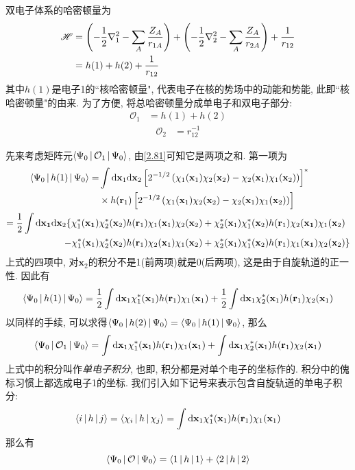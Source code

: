 双电子体系的哈密顿量为
\begin{align}
\mathscr{H}&=\left( -\frac{1}{2}\nabla_1^2 - \sum_A\frac{Z_A}{r_{1A}} \right) + \left( -\frac{1}{2}\nabla_2^2 - \sum_A\frac{Z_A}{r_{2A}} \right) + \frac{1}{r_{12}}\notag\\
&=h(1) + h(2) + \frac{1}{r_{12}}
\end{align}
其中$h(1)$是电子1的``核哈密顿量", 
代表电子在核的势场中的动能和势能, 
此即``核哈密顿量"的由来. 
为了方便, 
将总哈密顿量分成单电子和双电子部分:
\begin{align}
\mathcal{O}_1&=h(1)+h(2)
\label{2.81}
\end{align}
\begin{align}
\mathcal{O}_2&=r_{12}^{-1}
\end{align}

先来考虑矩阵元$\Braket{\Psi_0|\mathcal{O}_1|\Psi_0}$, 
由\autoref{2.81}可知它是两项之和. 
第一项为
\begin{align}
\braket{\Psi_0|h(1)|\Psi_0}=&\int\db{x}_1\db{x}_2\left[2^{-1/2}\left(\chi_1(\mathbf{x}_1)\chi_2(\mathbf{x}_2)-\chi_2(\mathbf{x}_1)\chi_1(\mathbf{x}_2)\right)\right]^*\notag\\
\qquad&\times h(\mathbf{r}_1)\left[ 2^{-1/2}\left(\chi_1(\mathbf{x}_1)\chi_2(\mathbf{x}_2)-\chi_2(\mathbf{x}_1)\chi_1(\mathbf{x}_2)\right)\right]\notag\\
=\frac{1}{2}\int\dd{\mathbf{x}_1}\dd\mathbf{x}_2\{\chi_1^*(\mathbf{x_1})&\chi_2^*(\mathbf{x}_2)h(\mathbf{r}_1)\chi_1(\mathbf{x}_1)\chi_2(\mathbf{x}_2) + \chi_2^*(\mathbf{x}_1)\chi_1^*(\mathbf{x}_2)h(\mathbf{r}_1)\chi_2(\mathbf{x_1})\chi_1(\mathbf{x}_2) \notag\\
 - \chi_1^*(\mathbf{x}_1)&\chi_2^*(\mathbf{x}_2)h(\mathbf{r}_1)\chi_2(\mathbf{x}_1)\chi_1(\mathbf{x}_2) + \chi_2^*(\mathbf{x}_1)\chi_1^*(\mathbf{x}_2)h(\mathbf{r}_1)\chi_1(\mathbf{x_1})\chi_2(\mathbf{x}_2)
\}
\end{align}
上式的四项中, 
对$\mathbf{x}_2$的积分不是1(前两项)就是0(后两项), 
这是由于自旋轨道的正一性. 
因此有
\begin{equation}
\braket{\Psi_0|h(1)|\Psi_0}=\frac{1}{2}\int\dd\mathbf{x}_1\chi_1^*(\mathbf{x}_1)h(\mathbf{r}_1)\chi_1(\mathbf{x}_1)+\frac{1}{2}\int\dd\mathbf{x}_1\chi_2^*(\mathbf{x}_1)h(\mathbf{r}_1)\chi_2(\mathbf{x}_1)
\end{equation}
以同样的手续, 
可以求得$\Braket{\Psi_0|h(2)|\Psi_0}=\Braket{\Psi_0|h(1)|\Psi_0}$, 
那么
\begin{equation}
\braket{\Psi_0|\mathcal{O}_1|\Psi_0}=\int\dd\mathbf{x}_1\chi_1^*(\mathbf{x}_1)h(\mathbf{r}_1)\chi_1(\mathbf{x}_1) + \int\dd\mathbf{x}_1\chi_2^*(\mathbf{x}_1)h(\mathbf{r}_1)\chi_2(\mathbf{x}_1)
\end{equation}
上式中的积分叫作\emph{单电子积分}, 
也即, 
积分都是对单个电子的坐标作的. 
积分中的傀标习惯上都选成电子1的坐标. 
我们引入如下记号来表示包含自旋轨道的单电子积分:
\begin{equation}
\braket{i|h|j}=\braket{\chi_i|h|\chi_j}=\int\dd\mathbf{x}_1\chi_1^*(\mathbf{x}_1)h(\mathbf{r}_1)\chi_1(\mathbf{x}_1)
\end{equation}
那么有
\begin{equation}
\Braket{\Psi_0|\mathcal{O}|\Psi_0}=\Braket{1|h|1}+\Braket{2|h|2}
\end{equation}

